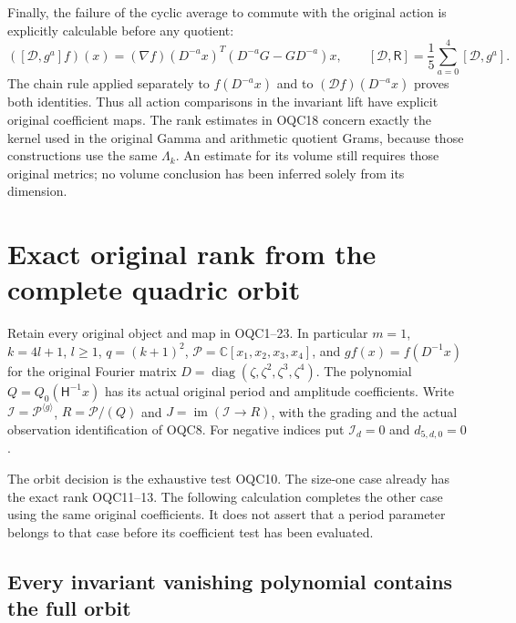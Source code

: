 \documentclass[11pt,a4paper]{article}
\begin{document}
Finally, the failure of the cyclic average to commute with the
original action is explicitly calculable before any quotient:
\[
 ([\mathcal D,g^a]f)(x)
   =(\nabla f)(D^{-a}x)^T
                   (D^{-a}G-GD^{-a})x,
 \qquad
 [\mathcal D,\mathsf R]=\frac15\sum_{a=0}^4[\mathcal D,g^a].
 \tag{OQC23}
\]
The chain rule applied separately to $f(D^{-a}x)$ and to
$(\mathcal Df)(D^{-a}x)$ proves both identities. Thus all
action comparisons in the invariant lift have explicit original
coefficient maps. The rank estimates in OQC18 concern exactly
the kernel used in the original Gamma and arithmetic quotient
Grams, because those constructions use the same $\Lambda_k$.
An estimate for its volume still requires those original metrics;
no volume conclusion has been inferred solely from its dimension.


\clearpage
\section{Exact original rank from the complete quadric orbit}
\label{sec:OQX}

Retain every original object and map in OQC1--23. In particular
$m=1$, $k=4l+1$, $l\geq1$, $q=(k+1)^2$,
$\mathscr P=\mathbb C[x_1,x_2,x_3,x_4]$, and
$g f(x)=f(D^{-1}x)$ for the original Fourier matrix
$D=\operatorname{diag}(\zeta,\zeta^2,\zeta^3,\zeta^4)$.
The polynomial $Q=Q_0(\mathsf H^{-1}x)$ has its actual original
period and amplitude coefficients. Write
$\mathscr I=\mathscr P^{\langle g\rangle}$,
$R=\mathscr P/(Q)$ and $J=\operatorname{im}(\mathscr I\to R)$,
with the grading and the actual observation identification of OQC8.
For negative indices put $\mathscr I_d=0$ and $d_{5,d,0}=0$.

The orbit decision is the exhaustive test OQC10. The size-one
case already has the exact rank OQC11--13. The following calculation
completes the other case using the same original coefficients. It
does not assert that a period parameter belongs to that case before
its coefficient test has been evaluated.

\subsection{Every invariant vanishing polynomial contains the full orbit}
\end{document}
